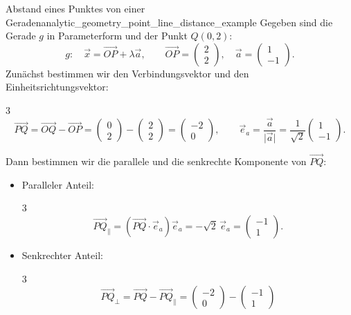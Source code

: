 \begin{ExampleBox}{Abstand eines Punktes von einer Geraden}{analytic_geometry_point_line_distance_example}
  Gegeben sind die Gerade $g$ in Parameterform und der Punkt $Q(0,2)$:
  \[
    g:\quad\vec x=\overrightarrow{OP}+\lambda\vec a,
    \qquad
    \overrightarrow{OP}=\begin{pmatrix}2\\2\end{pmatrix},
    \quad
    \vec a=\begin{pmatrix}1\\-1\end{pmatrix}.
  \]
  Zunächst bestimmen wir den Verbindungsvektor und den Einheitsrichtungsvektor:
  \begin{ClozeArea}[34]{3}
    \[
      \overrightarrow{PQ}=\overrightarrow{OQ}-\overrightarrow{OP}
        =\begin{pmatrix}0\\2\end{pmatrix}-\begin{pmatrix}2\\2\end{pmatrix}
        =\begin{pmatrix}-2\\0\end{pmatrix},
      \qquad
      \vec e_a=\frac{\vec a}{\lvert\vec a\rvert}
        =\frac1{\sqrt2}\begin{pmatrix}1\\-1\end{pmatrix}.
    \]
  \end{ClozeArea}
  Dann bestimmen wir die parallele und die senkrechte Komponente von $\overrightarrow{PQ}$:
  \begin{itemize}
    \item Paralleler Anteil:
      \begin{ClozeArea}[32]{3}
        \[
          \overrightarrow{PQ}_{\parallel}
            =(\overrightarrow{PQ}\cdot\vec e_a)\vec e_a
            =-\sqrt2\,\vec e_a
            =\begin{pmatrix}-1\\1\end{pmatrix}.
        \]
      \end{ClozeArea}
    \item Senkrechter Anteil:
      \begin{ClozeArea}[32]{3}
        \[
          \overrightarrow{PQ}_{\perp}
            =\overrightarrow{PQ}-\overrightarrow{PQ}_{\parallel}
            =\begin{pmatrix}-2\\0\end{pmatrix}-\begin{pmatrix}-1\\1\end{pmatrix}
\]
\end{ClozeArea}
\end{itemize}
\end{ExampleBox}
